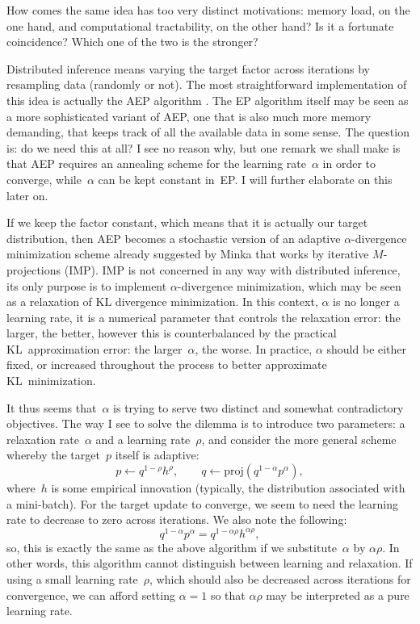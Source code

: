 \documentclass{article}
\begin{document}
How comes the same idea has too very distinct motivations: memory load, on the one hand, and computational tractability, on the other hand? Is it a fortunate coincidence? Which one of the two is the stronger?


Distributed inference means varying the target factor across iterations by resampling data (randomly or not). The most straightforward implementation of this idea is actually the AEP algorithm \cite{Dehaene-18}. The EP algorithm itself may be seen as a more sophisticated variant of AEP, one that is also much more memory demanding, that keeps track of all the available data in some sense. The question is: do we need this at all? I see no reason why, but one remark we shall make is that AEP requires an annealing scheme for the learning rate~$\alpha$ in order to converge, while~$\alpha$ can be kept constant in~EP. I will further elaborate on this later on.

If we keep the factor constant, which means that it is actually our target distribution, then AEP becomes a stochastic version of an adaptive $\alpha$-divergence minimization scheme already suggested by Minka \cite{Minka-05} that works by iterative $M$-projections (IMP). IMP is not concerned in any way with distributed inference, its only purpose is to implement $\alpha$-divergence minimization, which may be seen as a relaxation of KL divergence minimization. In this context, $\alpha$ is no longer a learning rate, it is a numerical parameter that controls the relaxation error: the larger, the better, however this is counterbalanced by the practical KL~approximation error: the larger~$\alpha$, the worse. In practice, $\alpha$ should be either fixed, or increased throughout the process to better approximate KL~minimization. 

It thus seems that~$\alpha$ is trying to serve two distinct and somewhat contradictory objectives. The way I see to solve the dilemma is to introduce two parameters: a relaxation rate~$\alpha$ and a learning rate~$\rho$, and consider the more general scheme whereby the target~$p$ itself is adaptive:
$$
p \leftarrow q^{1-\rho} h^\rho,
\qquad
q \leftarrow \text{proj}(q^{1-\alpha}p^\alpha),
$$
where~$h$ is some empirical innovation (typically, the distribution associated with a mini-batch). For the target update to converge, we seem to need the learning rate to decrease to zero across iterations. We also note the following:
$$
q^{1-\alpha}p^\alpha = q^{1-\alpha\rho}h^{\alpha\rho},
$$
so, this is exactly the same as the above algorithm if we substitute~$\alpha$ by $\alpha\rho$. In other words, this algorithm cannot distinguish between learning and relaxation. If using a small learning rate~$\rho$, which should also be decreased across iterations for convergence, we can afford setting $\alpha=1$ so that $\alpha\rho$ may be interpreted as a pure learning rate.
\end{document}
